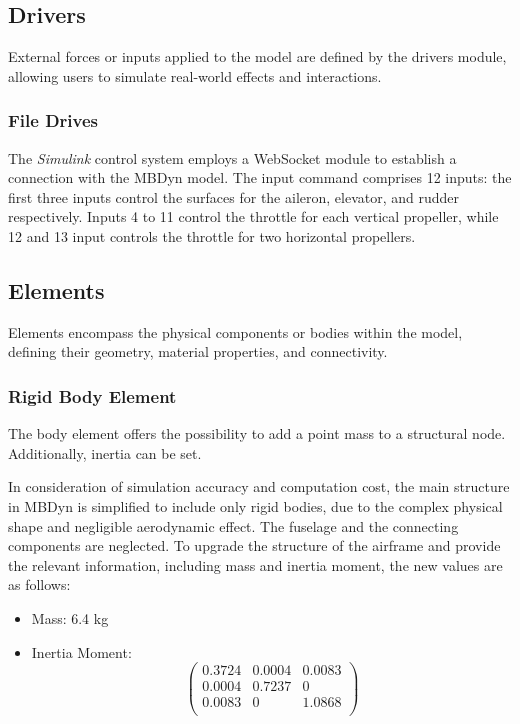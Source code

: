 \subsection{Drivers} 
External forces or inputs applied to the model are defined by the drivers module, allowing users to simulate real-world effects and interactions.

\subsubsection{File Drives}
The \textit{Simulink} control system employs a WebSocket module to establish a connection with the MBDyn model. The input command comprises 12 inputs: the first three inputs control the surfaces for the aileron, elevator, and rudder respectively. Inputs 4 to 11 control the throttle for each vertical propeller, while 12 and 13 input controls the throttle for two horizontal propellers.

\subsection{Elements} 
Elements encompass the physical components or bodies within the model, defining their geometry, material properties, and connectivity.

\subsubsection{Rigid Body Element} 
The body element offers the possibility to add a point mass to a structural node. Additionally, inertia can be set.

In consideration of simulation accuracy and computation cost, the main structure in MBDyn is simplified to include only rigid bodies, due to the complex physical shape and negligible aerodynamic effect. The fuselage and the connecting components are neglected. To upgrade the structure of the airframe and provide the relevant information, including mass and inertia moment, the new values are as follows:

\begin{itemize}
    \item Mass: 6.4 kg
    \item Inertia Moment:
    \[
    \begin{pmatrix}
    0.3724 & 0.0004 & 0.0083 \\
    0.0004 & 0.7237 & 0 \\
    0.0083 & 0 & 1.0868 \\
    \end{pmatrix}
    \]
\end{itemize}

